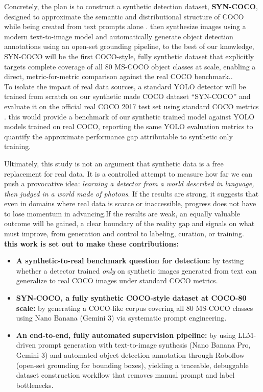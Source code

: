 \documentclass[conference]{IEEEtran}
\begin{document}
Concretely, the plan is to construct a synthetic detection dataset, \textbf{SYN-COCO}, designed to approximate the semantic and distributional structure of COCO while being created from text prompts alone \citep{lin2014coco}. then synthesize images using a modern text-to-image model \citep{google2025gemini25flashimageblog,google2025vertexgemini25flashimage} and automatically generate object detection annotations using an open-set grounding pipeline\citep{liu2023groundingdino,kirillov2023sam}, to the best of our knowledge, SYN-COCO will be the first COCO-style, fully synthetic dataset that explicitly targets complete coverage of all 80 MS-COCO object classes at scale, enabling a direct, metric-for-metric comparison against the real COCO benchmark..\\

To isolate the impact of real data sources, a standard YOLO detector will be trained from scratch on our synthetic made COCO dataset ``SYN-COCO'' and evaluate it on the official real COCO 2017 test set using standard COCO metrics \citep{lin2014coco}. this would provide a benchmark of our synthetic trained model against YOLO models trained on real COCO, reporting the same YOLO evaluation metrics to quantify the approximate performance gap attributable to synthetic only training.


Ultimately, this study is not an argument that synthetic data is a free replacement for real data. It is a controlled attempt to measure how far we can push a provocative idea: \emph{learning a detector from a world described in language, then judged in a world made of photons}. If the results are strong, it suggests that even in domains where real data is scarce or inaccessible, progress does not have to lose momentum in advancing.If the results are weak, an equally valuable outcome will be gained, a clear boundary of the reality gap and signals on what must improve, from generation and control to labeling, curation, or training.\\

\noindent\textbf{this work is set out to make these contributions:}
\begin{itemize}[leftmargin=*,itemsep=2pt,topsep=2pt]
    \item \textbf{A synthetic-to-real benchmark question for detection:} by testing whether a detector trained \emph{only} on synthetic images generated from text can generalize to real COCO images under standard COCO metrics.
    \item \textbf{SYN-COCO, a fully synthetic COCO-style dataset at COCO-80 scale:} by generating a COCO-like corpus covering all 80 MS-COCO classes using Nano Banana (Gemini 3) via systematic prompt engineering.
    \item \textbf{An end-to-end, fully automated supervision pipeline:} by using LLM-driven prompt generation with text-to-image synthesis (Nano Banana Pro, Gemini 3) and automated object detection annotation through Roboflow (open-set grounding for bounding boxes), yielding a traceable, debuggable dataset construction workflow that removes manual prompt and label bottlenecks.

\end{itemize}
\end{document}
